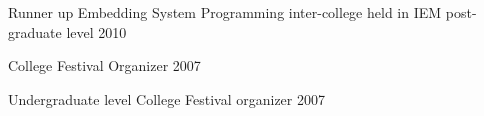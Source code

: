 \begin{cvhonors}
  \cvhonor
    {Runner up Embedding System Programming inter-college held in IEM post-graduate level} %
    {} %
    {} %
    {2010} %

  \cvhonor
    {College Festival Organizer} %
    {} %
    {} %
    {2007} %

  \cvhonor
    {Undergraduate level College Festival organizer} %
    {} %
    {} %
    {2007} %



\end{cvhonors}

